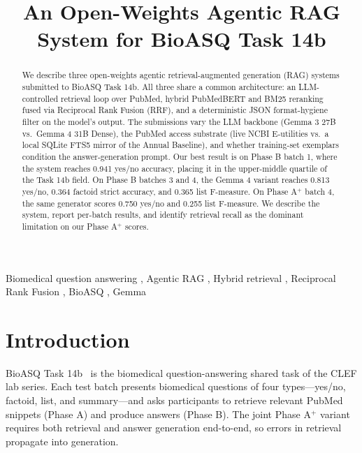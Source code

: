 \documentclass[sigconf,natbib=true]{ceurart}
\begin{document}
\title{An Open-Weights Agentic RAG System for BioASQ Task 14b}


\begin{abstract}
We describe three open-weights agentic retrieval-augmented generation (RAG) systems submitted to BioASQ Task 14b. All three share a common architecture: an LLM-controlled retrieval loop over PubMed, hybrid PubMedBERT and BM25 reranking fused via Reciprocal Rank Fusion (RRF), and a deterministic JSON format-hygiene filter on the model's output. The submissions vary the LLM backbone (Gemma 3 27B vs.\ Gemma 4 31B Dense), the PubMed access substrate (live NCBI E-utilities vs.\ a local SQLite FTS5 mirror of the Annual Baseline), and whether training-set exemplars condition the answer-generation prompt. Our best result is on Phase B batch 1, where the system reaches 0.941 yes/no accuracy, placing it in the upper-middle quartile of the Task 14b field. On Phase B batches 3 and 4, the Gemma 4 variant reaches 0.813 yes/no, 0.364 factoid strict accuracy, and 0.365 list F-measure. On Phase A$^+$ batch 4, the same generator scores 0.750 yes/no and 0.255 list F-measure. We describe the system, report per-batch results, and identify retrieval recall as the dominant limitation on our Phase A$^+$ scores.
\end{abstract}

\begin{keywords}
  Biomedical question answering \sep
  Agentic RAG \sep
  Hybrid retrieval \sep
  Reciprocal Rank Fusion \sep
  BioASQ \sep
  Gemma
\end{keywords}

\maketitle


\section{Introduction}
\label{sec:intro}

BioASQ Task 14b~\cite{nentidis2026bioasq} is the biomedical question-answering shared task of the CLEF lab series. Each test batch presents biomedical questions of four types---yes/no, factoid, list, and summary---and asks participants to retrieve relevant PubMed snippets (Phase A) and produce answers (Phase B). The joint Phase A$^+$ variant requires both retrieval and answer generation end-to-end, so errors in retrieval propagate into generation.
\end{document}
